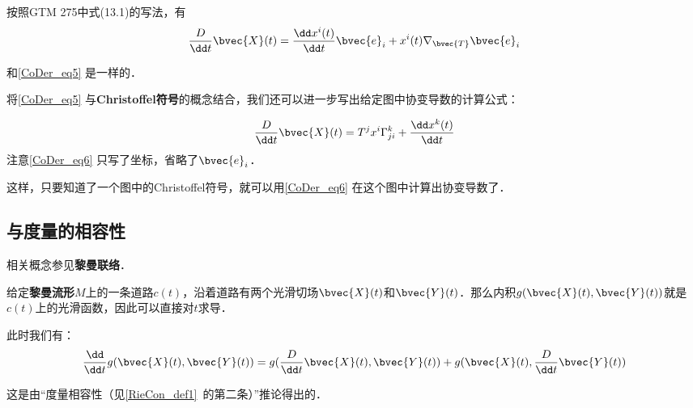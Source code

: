 按照GTM 275中式(13.1)的写法，有
\begin{equation}
\frac{D}{\dd t}\bvec{X}(t)=\frac{\dd x^i(t)}{\dd t}\bvec{e}_i+{x}^i(t)\nabla_\bvec{T}\bvec{e}_i
\end{equation}

和\autoref{CoDer_eq5} 是一样的．

将\autoref{CoDer_eq5} 与\textbf{Christoffel符号}的概念结合，我们还可以进一步写出给定图中协变导数的计算公式：

\begin{equation}\label{CoDer_eq6}
\frac{D}{\dd t}\bvec{X}(t)=T^jx^i\Gamma^k_{ji}+\frac{\dd x^k(t)}{\dd t}
\end{equation}
注意\autoref{CoDer_eq6} 只写了坐标，省略了$\bvec{e}_i$．

这样，只要知道了一个图中的Christoffel符号，就可以用\autoref{CoDer_eq6} 在这个图中计算出协变导数了．

\subsection{与度量的相容性}

相关概念参见\textbf{黎曼联络}．

给定\textbf{黎曼流形}$M$上的一条道路$c(t)$，沿着道路有两个光滑切场${\bvec{X}}(t)$和${\bvec{Y}}(t)$．那么内积$g({\bvec{X}}(t), {\bvec{Y}}(t))$就是$c(t)$上的光滑函数，因此可以直接对$t$求导．

此时我们有：
\begin{equation}
\frac{\dd}{\dd t}g({\bvec{X}}(t), {\bvec{Y}}(t))=g(\frac{D}{\dd t}{\bvec{X}}(t), {\bvec{Y}}(t))+g({\bvec{X}}(t), \frac{D}{\dd t}{\bvec{Y}}(t))
\end{equation}

这是由“度量相容性（见\autoref{RieCon_def1}~的第二条）”推论得出的．


